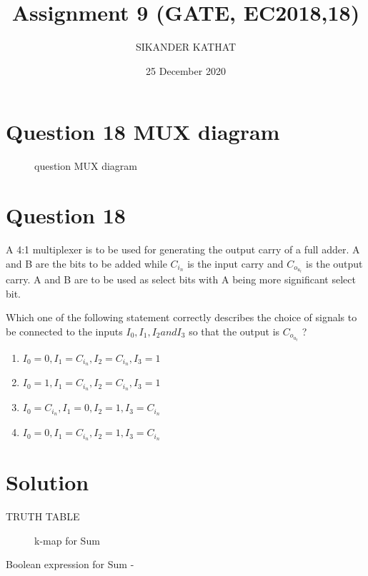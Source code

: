 \documentclass{article}
\title{Assignment 9 (GATE, EC2018,18)}
\author{SIKANDER KATHAT }
\date{25 December 2020}
\begin{document}
\maketitle

\section{ Question  18 MUX diagram }
\begin{figure}[!ht]
\centering
{

}
\caption{question MUX diagram}
\label{MUX diagram)}
\end{figure}

\section{Question 18}
A 4:1 multiplexer is to be used for generating the output carry of a full adder. A and B are the bits to be added while $C_i_n$ is the input carry and $C_o_u_t$ is the output carry. A and B are to be used as select bits with A being more significant select bit.

Which one of the following statement correctly describes the choice of signals to be connected to the inputs  $ I_0, I_1, I_2 and I_3 $  so that the output is $C_o_u_t$  ?

\begin{enumerate}
    \item$I_0=0,  I_1=C_i_n,  I_2=C_i_n,  I_3=1$
    \item$I_0=1,  I_1=C_i_n,  I_2=C_i_n,  I_3=1$
    \item$I_0=C_i_n,  I_1=0,  I_2=1,  I_3=C_i_n$
    \item$I_0=0,  I_1=C_i_n,  I_2=1,  I_3=C_i_n$
\end{enumerate}

\section{Solution}
\begin{table}[!ht]
\centering
{

}
\caption{TRUTH TABLE}
\label{table}
\end{table}


\begin{figure}[!ht]
\centering
{

}
\caption{k-map for Sum}
\label{kmap Sum}
\end{figure}


    
    Boolean expression for Sum  -
    
\end{document}
